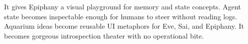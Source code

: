 \ProjectionBand
{It gives Epiphany a visual playground for memory and state concepts.}
{Agent state becomes inspectable enough for humans to steer without reading logs.}
{Aquarium ideas become reusable UI metaphors for Eve, Sai, and Epiphany.}
{It becomes gorgeous introspection theater with no operational bite.}

